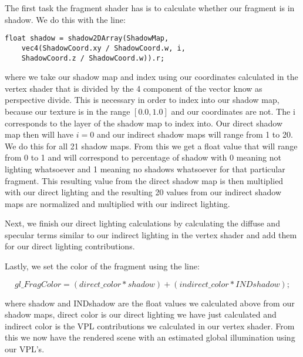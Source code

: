 The first task the fragment shader has is to calculate whether our fragment is in shadow.  We do this with the line:


\begin{lstlisting}
float shadow = shadow2DArray(ShadowMap, 
	vec4(ShadowCoord.xy / ShadowCoord.w, i, 
	ShadowCoord.z / ShadowCoord.w)).r;
\end{lstlisting}

where we take our shadow map and index using our coordinates calculated in the vertex shader that is divided by the 4 component of the vector know as perspective divide.  This is necessary in order to index into our shadow map, because our texture is in the range $[0.0, 1.0]$ and our coordinates are not.  The i corresponds to the layer of the shadow map to index into.  Our direct shadow map then will have $i=0$ and our indirect shadow maps will range from 1 to 20.  We do this for all 21 shadow maps.  From this we get a float value that will range from 0 to 1 and will correspond to percentage of shadow with 0 meaning not lighting whatsoever and 1 meaning no shadows whatsoever for that particular fragment.  This resulting value from the direct shadow map is then multiplied with our direct lighting and the resulting 20 values from our indirect shadow maps are normalized and multiplied with our indirect lighting.

Next, we finish our direct lighting calculations by calculating the diffuse and specular terms similar to our indirect lighting in the vertex shader and add them for our direct lighting contributions.

Lastly, we set the color of the fragment using the line:


\begin{equation}
gl\_FragColor = (direct\_color*shadow) + (indirect\_color*INDshadow);
\end{equation}

where shadow and INDshadow are the float values we calculated above from our shadow maps, direct color is our direct lighting we have just calculated and indirect color is the VPL contributions we calculated in our vertex shader.  From this we now have the rendered scene with an estimated global illumination using our VPL's.
